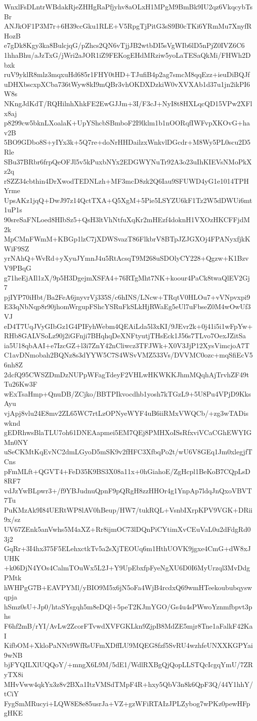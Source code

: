 WnxlFsDLntrWBdakRjeZHHgRaPfjyhv8aOLxH1MPgM9BmBk9IU2qz6VkqcybTsBr
ANJkOF1P3M7r+6H39ccGku1RLE+V5RpgTjPitG3sS9B0cTKi6YRmMu7XnyfRHozB
e7gDk8Kgy3ka8BulcjqG/pZhcs2QN6vTjjJB2wtbDI5sVgWIb6lD5nPjZ0IVZ6C6
1hhaBhu/aJzTxG/jWri2aJOR1iZ9FEKogEHdMRziw5yoLaTESaQkMi/FHWh2Dbxk
ruV9yklR8mlz3mqxuHd685r1FHY0tHD+TJufiB4p2ag7smcM8qqEzz+ieuDiBQJf
uDHXbscxpXCba736tWyw8kI9mQBr3vhOKDXDzkiW0vXVXAb1d37u1jn2ikPI6W8s
NKngJdKdT/RQHilnhXhkFE2EwGJJm+3I/F3cJ+NyI8t8HXLqcQD15VPw2XFlx8aj
p8299cw5bknLXoalaK+UpYShcbSBmboF2I9lklm1b1nOORqfIWFvpXKOvG+hav2B
5BO9GDbo8S+yIYx3k+5Q7re+doNrHHDailzxWnkvlDGcdr+M8Wy5PL0scu2D5Rle
SBu37BRbr6frpQeOFJl5v5kPuxbNYx2EDGWYNuTr92A3o23uIhKIEVsNMoPkXz2q
rSZZ34cbthin4DrXwodTEDNLzh+MF3mcD8zk2Q6Iau9SFUWD4yG1e1014TPHYrme
UpsAKz1jqQ+DwJ97z14QctTXA+Q5XgM+5Pie5LSYZU6kF1Tz2W5dDWUi6mt1uP1s
90sreSaFNLoed8HIbSz5+QsH3ltVhNtfuXqKr2mHEzf4doknH1VXOzHKCFFjdM2k
MpCMnFWmM+KBGp1lzC7jXDWSvazT86FlkbrV8BTpJZJGXOj4FPANyxfjkKWiF9SZ
yrNAhQ+WvRd+yXyuJYmnJ4u5RtAcsqT9M268uSDOlyCY228+Qgzw+K1BzvV9PBqG
g71heEjAIl1zX/9p5H3DgejmXSFA4+76RTgMht7NK+koour4PaCk8twaQlEV2Gj7
pjIYP70iHbt/Ba2FeA6jnyvrVj335S/c6hINS/LNcw+TRqtV0HLOu7+vVNpvxpi9
E33qNbNqp8r90jhomWrgupFShcYSRuFkSLkHjRWaEg5eUl7uFbseZ0M4wOwUf3VJ
eD4T7UqJVyGIbGz1G4PIFyhWebm4QEAiLda5l3xKI/9JEvr2k+0j41i5i1wFpYw+
RHb8GALVSoLz90j2iGFnji7BHqhqDeXNFtyutjTHsEck1J56s7TLvo7OexJZitSa
ia5U18qbAAI+e7IzcGZ+l3i7ZnY42nCliwcz3TFJWk+X0V3JjP12XysVimcjoA7T
C1avDNmobah2BQNz8s3dYYW5C7S4WSvVMZ533Vs/DVVMC0ozc+mqSfiEcV56nh8Z
2dcfQ95CWSZDmDzNUPpWFagTdeyF2VHLwHKWKKJhmMQqhAjTrvhZF49tTu26Kw3F
wExTsaHmp+QnuDB/ZCjko/BBTPIkvocdhb1yosh7kTGzL9+5U8Pu4VPjD9KksAyu
vjApj8vlu24E8mv2ZL65WC7rtLzOPNyeWYF4uB6iiRMxVWQCb/+zg3wTADiswknd
gEDRhwsBlaTLU7oh61DNEAapmei5EM7QEj8PMHXoISsRfxviVCaCGhEWYIGMn0NY
uSeCKMtKqEvNC2dmLGyoD5mSK9v2fHFC3XfbqPo2t/wU6V8GEq1Jm0xlegjfTCns
pFmMLft+QGVT4+FeD35K9BS3X08a11x+0hGiahoE/ZgHcpl1BeKoB7CQpLsD8RF7
vdJzYwBLpwr3+/f9YBJudnuQpnF9pQRgH8zzHHOr4g1YnpAp7ldqJnQxoVBVT7Tu
PuKMzAk9I84UERtWP8lAV0hBeup/HW7/tukRQL+VsnbIXrpKPV9VGK+DRii9x/sz
UV67ZEnk5anVwhs5M4aXZ+Rr8ijmOC73lDQnPiCYtimXvCEuVaL0u2dFdgRd03j2
GqRr+3I4hx375F5ELehxctkTv5a2sXjTEOUq6m1HthUOVK9jgxe4CmG+dW8xJUHK
+k06DjN4YOs4CalmTOuWx5L2J+Y9UpEbxfpFyeNgXU6D0I6MyUrzql3MvDdgPMtk
hWHPgG7B+EAVPYMl/yBIO9M5x6jN5oFa4WjB4rcdxQ69wmHTeekoububqyswqpja
hSmz0sU+Jp0/htaSYsgqh5m8eDQl+5peT2KJmYGO/Gs4u4sPWwoYznmfbpvt3phs
F6hf2mB/rYI/AvLw2ZcorFTvwdXVFGKLkn9ZjpB8MdZE5mjr8Tne1aFalkF42KaI
KifbOM+XkloPaNNt9WfRsUFmXDffLU9MQEG8fzf5SvRU4wzhfeUNXXKGPYai9wNB
bjFYQILXlUQQoY/+mngX6L9M/5dE1/WdlRXBgQjQopLLSTQcIcgqYmU/7ZRyTX8i
MHvVww4qkYx3z8v2BXa1ItzVMSdTMpF4R+hxy5QbV3n8k6QpF3Q/44Y1hhY/tCiY
FygSmMRucyi+LQW8E8e85usrJa+VZ+gzWFiRTAIzJPLZybog7wPKz0pewHFpgHKE
